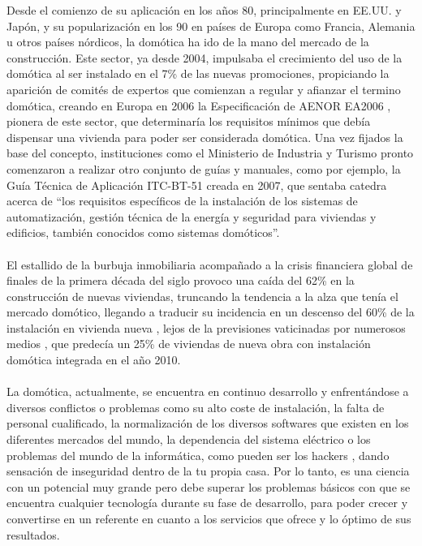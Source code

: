 Desde el comienzo de su aplicación en los años 80, principalmente en EE.UU. y Japón, y su popularización en los 90 en países de Europa como Francia, Alemania u otros países nórdicos, la domótica ha ido de la mano del mercado de la construcción. Este sector, ya desde 2004, impulsaba el crecimiento del uso de la domótica al ser instalado en el 7\% \cite{Ikei:2004} de las nuevas promociones, propiciando la aparición de comités de expertos que comienzan a regular y afianzar el termino domótica, creando en Europa en 2006 la Especificación de AENOR EA2006 \cite{direct:2004}, pionera de este sector, que determinaría los requisitos mínimos que debía dispensar una vivienda para poder ser considerada domótica. Una vez fijados la base del concepto, instituciones  como el Ministerio de Industria y Turismo pronto comenzaron a realizar otro conjunto de guías y manuales, como por ejemplo, la Guía Técnica de Aplicación ITC-BT-51 \cite{BOE:2002} creada en 2007, que sentaba catedra acerca de “los requisitos específicos de la instalación de los sistemas de automatización, gestión técnica de la energía y seguridad para viviendas y edificios, también conocidos como sistemas domóticos”.\\\\ 
El estallido de la burbuja inmobiliaria acompañado a la crisis financiera global de finales de la primera década del siglo provoco una caída del 62\% en la construcción de nuevas viviendas, truncando la tendencia a la alza que tenía el mercado domótico, llegando a traducir su incidencia en un descenso del 60\% de la instalación en vivienda nueva \cite{AED:2011}, lejos de la previsiones vaticinadas por numerosos medios \cite{mundo:2010} \cite{Info:2008}, que predecía un 25\% de viviendas de nueva obra con instalación domótica integrada en el año 2010.\\\\
 La domótica, actualmente, se encuentra en continuo desarrollo y enfrentándose a diversos conflictos o problemas como su alto coste de instalación, la falta de personal cualificado, la normalización de los diversos softwares que existen en los diferentes mercados del mundo, la dependencia del sistema eléctrico o los problemas del mundo de la informática, como pueden ser los hackers \cite{cerda:2018}, dando sensación de inseguridad dentro de la tu propia casa. Por lo tanto, es una ciencia con un potencial muy grande pero debe superar los problemas básicos con que se encuentra cualquier tecnología durante su fase de desarrollo, para poder crecer y convertirse en un referente en cuanto a los servicios que ofrece y lo óptimo de sus resultados.\\\\
